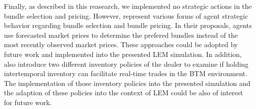Finally, as described in this reasearch, we implemented no strategic
actions in the bundle selection and pricing. 
However,  represent various 
forms of agent strategic behavior regarding bundle selection 
and bundle pricing.
In their proposals, agents use forecasted market prices 
to determine the prefered bundles
instead of the most recently observed market prices. 
These approaches could be adopted by future work and implemented
into the presented LEM simulation.
In addition,  also introduce two
different inventory policies of the dealer to examine if 
holding intertemporal inventory can facilitate real-time trades 
in the BTM environment. The implementation of those inventory policies
into the presented simulation and the adaption of these policies
into the context of LEM could be also of interest for future work.  








\begin{comment}

\end{comment}